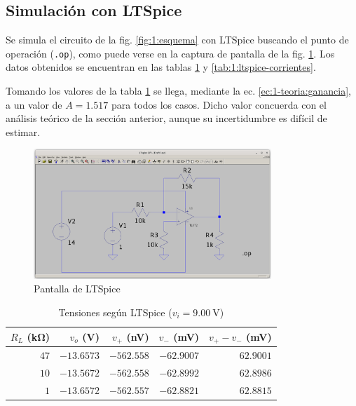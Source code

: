 \subsection{Simulación con LTSpice}

Se simula el circuito de la fig. \ref{fig:1:esquema} con LTSpice buscando el 
punto de operación (\verb|.op|), como puede verse en la captura de pantalla
de la fig. \ref{fig:1:ltspice}. Los datos obtenidos se encuentran en las tablas
\ref{tab:1:ltspice-tensiones} y \ref{tab:1:ltspice-corrientes}.

Tomando los valores de la tabla \ref{tab:1:ltspice-tensiones} se llega,
mediante la ec. \ref{ec:1-teoria:ganancia}, a un valor de $A = 1.517$ para
todos los casos. Dicho valor concuerda con el análisis teórico de la sección
anterior, aunque su incertidumbre es difícil de estimar.

\begin{figure}[H]
    \centering
    \includegraphics[width=0.8\textwidth]{img/1/ltspice.png}
    \caption{Pantalla de LTSpice}
    \label{fig:1:ltspice}
\end{figure}

\begin{table}[H]
    \centering
    \begin{tabular}{@{}r|rrrr@{}}
    \toprule
    $R_L$ (\si{\kilo\ohm}) & $v_o$ (\si{\volt}) & $v_+$ (\si{\nano\volt}) & 
    $v_-$ (\si{\milli\volt}) & $v_+ - v_-$ (\si{\milli\volt}) \\
    \midrule
    $47$ & $-13.6573$ & $-562.558$ & $-62.9007$ & $62.9001$ \\
    $10$ & $-13.5672$ & $-562.558$ & $-62.8992$ & $62.8986$ \\
     $1$ & $-13.6572$ & $-562.557$ & $-62.8821$ & $62.8815$ \\ \bottomrule
    \end{tabular}
    \caption{Tensiones según LTSpice ($v_i = \SI{9.00}{\volt}$)}
    \label{tab:1:ltspice-tensiones}
\end{table}

